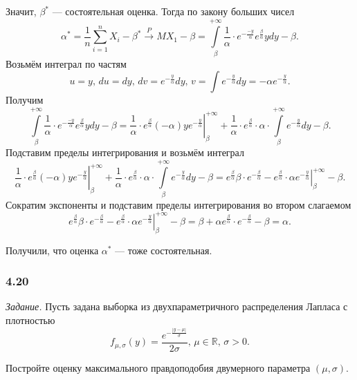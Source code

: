 Значит, $ \beta^*$ --- состоятельная оценка.
Тогда по закону больших чисел
$$ \alpha^* =
  \frac{1}{n} \sum \limits_{i = 1}^n X_i - \beta^* \overset{P}{ \to }
  MX_1 - \beta =
  \int \limits_{ \beta }^{+ \infty }
    \frac{1}{ \alpha } \cdot e^{- \frac{-y}{ \alpha }} e^{ \frac{ \beta }{ \alpha }} ydy -
  \beta. $$
Возьмём интеграл по частям
$$u = y, \,
  du = dy, \,
  dv = e^{- \frac{y}{ \alpha }} dy, \,
  v = \int e^{- \frac{y}{ \alpha }} dy = - \alpha e^{- \frac{y}{ \alpha }}.$$
Получим
$$ \int \limits_{ \beta }^{+ \infty }
    \frac{1}{ \alpha } \cdot e^{- \frac{-y}{ \alpha }} e^{ \frac{ \beta }{ \alpha }} ydy -
  \beta =
  \left.
    \frac{1}{ \alpha } \cdot
    e^{ \frac{ \beta }{ \alpha }} \left( - \alpha \right) y e^{- \frac{y}{ \alpha }}
  \right|_{ \beta }^{+ \infty } +
  \frac{1}{ \alpha } \cdot e^{ \frac{ \beta }{ \alpha }} \cdot \alpha \cdot
  \int \limits_{ \beta }^{+ \infty } e^{- \frac{y}{ \alpha }} dy -
  \beta.$$
Подставим пределы интегрирования и возьмём интеграл
$$ \left.
    \frac{1}{ \alpha } \cdot
    e^{ \frac{ \beta }{ \alpha }} \left( - \alpha \right) y e^{- \frac{y}{ \alpha }}
  \right|_{ \beta }^{+ \infty } +
  \frac{1}{ \alpha } \cdot e^{ \frac{ \beta }{ \alpha }} \cdot \alpha \cdot
  \int \limits_{ \beta }^{+ \infty } e^{- \frac{y}{ \alpha }} dy -
  \beta =
  e^{ \frac{ \beta }{ \alpha }} \beta \cdot e^{- \frac{ \beta }{ \alpha }} -
  e^{ \frac{ \beta }{ \alpha }} \cdot
  \left. \alpha e^{- \frac{y}{ \alpha }} \right|_{ \beta }^{+ \infty } -
  \beta.$$
Сократим экспоненты и подставим пределы интегрирования во втором слагаемом
$$e^{ \frac{ \beta }{ \alpha }} \beta \cdot e^{- \frac{ \beta }{ \alpha }} -
  e^{ \frac{ \beta }{ \alpha }} \cdot
  \left. \alpha e^{- \frac{y}{ \alpha }} \right|_{ \beta }^{+ \infty } -
  \beta =
  \beta + \alpha e^{ \frac{ \beta }{ \alpha }} \cdot e^{- \frac{ \beta }{ \alpha }} - \beta =
  \alpha.$$

Получили, что оценка $ \alpha^*$ --- тоже состоятельная.

\subsubsection*{4.20}

\textit{Задание.} Пусть задана выборка из двухпараметричного распределения Лапласа с плотностью
$$f_{ \mu, \sigma} \left( y \right) =
  \frac{e^{- \frac{ \left| y - \mu \right| }{ \sigma }}}{2 \sigma }, \,
  \mu \in \mathbb{R}, \,
  \sigma > 0.$$

Постройте оценку максимального правдоподобия двумерного параметра $ \left( \mu, \sigma \right) $.

